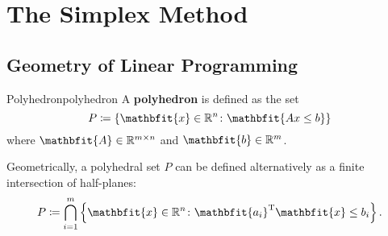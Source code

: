 \documentclass[math, code]{amznotes}
\theoremstyle{remark}
\begin{document}
\chapter{The Simplex Method}
\section{Geometry of Linear Programming}
\begin{dfnbox}{Polyhedron}{polyhedron}
    A {\color{red} \textbf{polyhedron}} is defined as the set
    \begin{equation*}
        P \coloneqq \left\{\mathbfit{x} \in \R^n \colon \mathbfit{Ax \leq b}\right\}
    \end{equation*}
    where $\mathbfit{A} \in \R^{m \times n}$ and $\mathbfit{b} \in \R^m$.
\end{dfnbox}
Geometrically, a polyhedral set $P$ can be defined alternatively as a finite intersection of half-planes:
\begin{equation*}
    P \coloneqq \bigcap_{i = 1}^m\left\{\mathbfit{x} \in \R^n \colon \mathbfit{a_i}^{\mathrm{T}}\mathbfit{x} \leq b_i\right\}.
\end{equation*}
\end{document}
